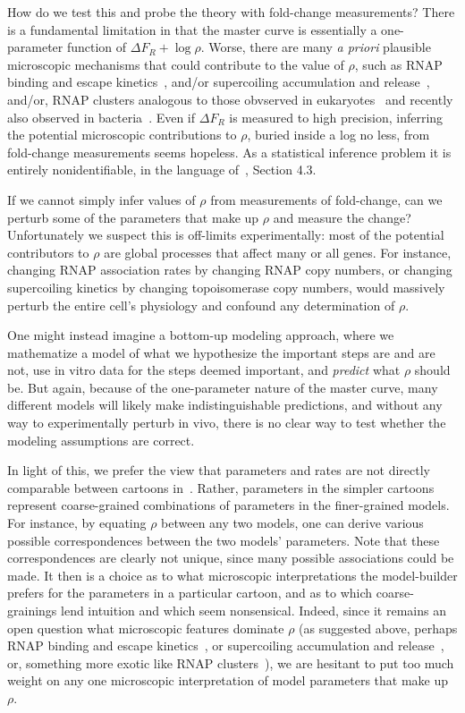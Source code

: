How do we test this and probe the theory with fold-change measurements? There is
a fundamental limitation in that the master curve is essentially a one-parameter
function of $\Delta F_R + \log\rho$. Worse, there are many \textit{a priori}
plausible microscopic mechanisms that could contribute to the value of $\rho$,
such as RNAP binding and escape kinetics~\cite{DeHaseth1998, Mitarai2015},
and/or supercoiling accumulation and release~\cite{Chong2014, Sevier2016},
and/or, RNAP clusters analogous to those obvserved in
eukaryotes~\cite{Cisse2013, Cho2016} and recently also observed in
bacteria~\cite{Ladouceur2020}. Even if $\Delta F_R$ is measured to high
precision, inferring the potential microscopic contributions to $\rho$, buried
inside a log no less, from fold-change measurements seems hopeless. As a
statistical inference problem it is entirely nonidentifiable, in the language
of~\cite{Gelman2013}, Section 4.3.

If we cannot simply infer values of $\rho$ from measurements of fold-change, can
we perturb some of the parameters that make up $\rho$ and measure the change?
Unfortunately we suspect this is off-limits experimentally: most of the
potential contributors to $\rho$ are global processes that affect many or all
genes. For instance, changing RNAP association rates by changing RNAP copy
numbers, or changing supercoiling kinetics by changing topoisomerase copy
numbers, would massively perturb the entire cell's physiology and confound any
determination of $\rho$.

One might instead imagine a bottom-up modeling approach, where we mathematize a
model of what we hypothesize the important steps are and are not, use in vitro
data for the steps deemed important, and \textit{predict} what $\rho$ should be.
But again, because of the one-parameter nature of the master curve, many
different models will likely make indistinguishable predictions, and without any
way to experimentally perturb in vivo, there is no clear way to test whether the
modeling assumptions are correct.

In light of this, we prefer the view that parameters and rates are not directly
comparable between cartoons in~. Rather, parameters in
the simpler cartoons represent coarse-grained combinations of parameters in the
finer-grained models. For instance, by equating $\rho$ between any two models,
one can derive various possible correspondences between the two models'
parameters. Note that these correspondences are clearly not unique, since many
possible associations could be made. It then is a choice as to what microscopic
interpretations the model-builder prefers for the parameters in a particular
cartoon, and as to which coarse-grainings lend intuition and which seem
nonsensical. Indeed, since it remains an open question what microscopic features
dominate $\rho$ (as suggested above, perhaps RNAP binding and escape
kinetics~\cite{DeHaseth1998, Mitarai2015}, or supercoiling accumulation and
release~\cite{Chong2014, Sevier2016}, or, something more exotic like RNAP
clusters~\cite{Cisse2013, Cho2016, Ladouceur2020}), we are hesitant to put too
much weight on any one microscopic interpretation of model parameters that make
up $\rho$.

